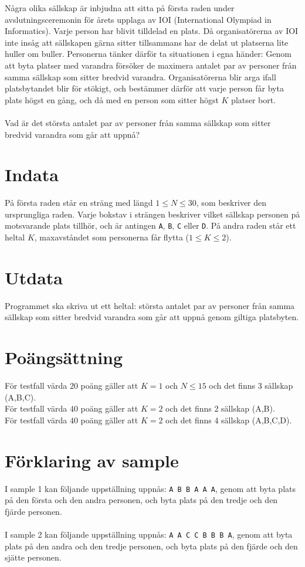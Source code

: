 Några olika sällskap är inbjudna att sitta på första raden under avslutningsceremonin för årets upplaga av IOI (International Olympiad in Informatics). Varje person har blivit tilldelad en plats. Då organisatörerna av IOI inte insåg att sällskapen gärna sitter tillsammans har de delat ut platserna lite huller om buller. Personerna tänker därför ta situationen i egna händer: Genom att byta platser med varandra försöker de maximera antalet par av personer från samma sällskap som sitter bredvid varandra. Organisatörerna blir arga ifall platsbytandet blir för stökigt, och bestämmer därför att varje person får byta plats högst en gång, och då med en person som sitter högst $K$ platser bort.\\ \\
Vad är det största antalet par av personer från samma sällskap som sitter bredvid varandra som går att uppnå?

\section*{Indata}
På första raden står en sträng med längd $1 \leq N \leq 30$, som beskriver den ursprungliga raden. Varje bokstav i strängen beskriver vilket sällskap personen på motsvarande plats tillhör, och är antingen \texttt{A}, \texttt{B}, \texttt{C} eller \texttt{D}. På andra raden står ett heltal $K$, maxavståndet som personerna får flytta ($1 \leq K \leq 2$). 

\section*{Utdata}
Programmet ska skriva ut ett heltal: största antalet par av personer från samma sällskap som sitter bredvid varandra som går att uppnå genom giltiga platsbyten.

\section*{Poängsättning}
För testfall värda $20$ poäng gäller att $K=1$ och $N \leq 15$ och det finns 3 sällskap (A,B,C).\\
För testfall värda $40$ poäng gäller att $K=2$ och det finns 2 sällskap (A,B).\\
För testfall värda $40$ poäng gäller att $K=2$ och det finns 4 sällskap (A,B,C,D).\\

\section*{Förklaring av sample}
I sample 1 kan följande uppställning uppnås: \texttt{A B B A A A}, genom att byta plats på den första och den andra personen, och byta plats på den tredje och den fjärde personen. \\ \\
I sample 2 kan följande uppställning uppnås: \texttt{A A C C B B B A}, genom att byta plats på den andra och den tredje personen, och byta plats på den fjärde och den sjätte personen. 
